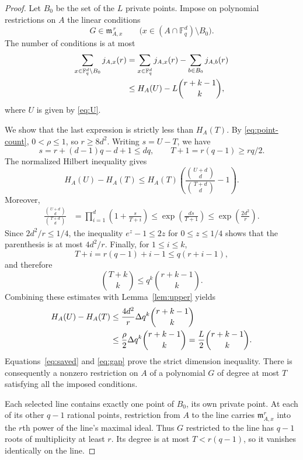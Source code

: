 \documentclass[11pt]{article}
\newcommand{\F}{\mathbb F}
\newcommand{\fm}{\mathfrak m}
\theoremstyle{remark}
\begin{document}
\begin{proof}
Let $B_0$ be the set of the $L$ private points. Impose on
polynomial restrictions on $A$ the linear conditions
\[
 G\in\fm_{A,x}^{\,r}
 \qquad\bigl(x\in(A\cap\F_q^d)\setminus B_0\bigr).
\]
The number of conditions is at most
\begin{align}
 \sum_{x\in\F_q^d\setminus B_0}j_{A,x}(r)
 &=\sum_{x\in\F_q^d}j_{A,x}(r)
     -\sum_{b\in B_0}j_{A,b}(r)\notag\\
 &\le H_A(U)-L\binom{r+k-1}{k},\label{eq:saved}
\end{align}
where $U$ is given by \eqref{eq:U}.

We show that the last expression is strictly less than $H_A(T)$.
By \eqref{eq:point-count}, $0<\rho\le1$, so $r\ge8d^2$.
Writing $s=U-T$, we have
\[
 s=r+(d-1)q-d+1\le dq,
 \qquad T+1=r(q-1)\ge rq/2.
\]
The normalized Hilbert inequality gives
\[
 H_A(U)-H_A(T)
 \le H_A(T)\left(
       \frac{\binom{U+d}{d}}{\binom{T+d}{d}}-1\right).
\]
Moreover,
\begin{align*}
 \frac{\binom{U+d}{d}}{\binom{T+d}{d}}
 &=\prod_{i=1}^d\left(1+\frac{s}{T+i}\right)
 \le\exp\!\left(\frac{ds}{T+1}\right)
 \le\exp\!\left(\frac{2d^2}{r}\right).
\end{align*}
Since $2d^2/r\le1/4$, the inequality $e^z-1\le2z$ for
$0\le z\le1/4$ shows that the parenthesis is at most $4d^2/r$.
Finally, for $1\le i\le k$,
\[
 T+i=r(q-1)+i-1\le q(r+i-1),
\]
and therefore
\[
 \binom{T+k}{k}\le q^k\binom{r+k-1}{k}.
\]
Combining these estimates with Lemma~\ref{lem:upper} yields
\begin{align}
 H_A(U)-H_A(T)
 &\le\frac{4d^2}{r}\Delta q^k\binom{r+k-1}{k}\notag\\
 &\le\frac{\rho}{2}\Delta q^k\binom{r+k-1}{k}
 =\frac L2\binom{r+k-1}{k}.
 \label{eq:gap}
\end{align}
Equations~\eqref{eq:saved} and \eqref{eq:gap} prove the strict
dimension inequality. There is consequently a nonzero restriction
on $A$ of a polynomial $G$ of degree at most $T$ satisfying all
the imposed conditions.

Each selected line contains exactly one point of $B_0$, its own
private point. At each of its other $q-1$ rational points,
restriction from $A$ to the line carries
$\fm_{A,x}^r$ into the $r$th power of the line's maximal ideal.
Thus $G$ restricted to the line has $q-1$ roots of multiplicity
at least $r$. Its degree is at most $T<r(q-1)$, so it vanishes
identically on the line.
\end{proof}
\end{document}
